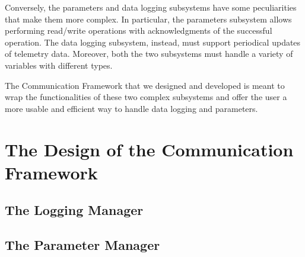 Conversely, the parameters and data logging subsystems have some peculiarities that make them more complex. 
In particular, the parameters subsystem allows performing read/write operations with acknowledgments of the successful operation.
The data logging subsystem, instead, must support periodical updates of telemetry data.
Moreover, both the two subsystems must handle a variety of variables with different types.

The Communication Framework that we designed and developed is meant to wrap the functionalities of these two complex subsystems and offer the user a more usable and efficient way to handle data logging and parameters.

\section{The Design of the Communication Framework}\label{sec:communication_frameworks_design}
\subsection{The Logging Manager}\label{subsec:logging_manager}
\subsection{The Parameter Manager}\label{subsec:parameter_manager}
